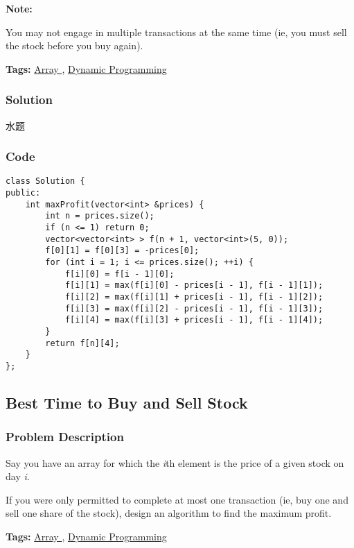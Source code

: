 \documentclass{article}
\begin{document}
\begin{CJK*}{UTF8}{gkai}
\textbf{Note:}


You may not engage in multiple transactions at the same time (ie, you must sell the stock before you buy again).


\textbf{Tags: }
\hyperref[ Array ]{ Array },  \hyperref[ Dynamic Programming ]{ Dynamic Programming }



\subsubsection*{Solution}
水题

\subsubsection*{Code}
\begin{lstlisting}
class Solution {
public:
    int maxProfit(vector<int> &prices) {
        int n = prices.size();
        if (n <= 1) return 0;
        vector<vector<int> > f(n + 1, vector<int>(5, 0));
        f[0][1] = f[0][3] = -prices[0];
        for (int i = 1; i <= prices.size(); ++i) {
            f[i][0] = f[i - 1][0];
            f[i][1] = max(f[i][0] - prices[i - 1], f[i - 1][1]);
            f[i][2] = max(f[i][1] + prices[i - 1], f[i - 1][2]);
            f[i][3] = max(f[i][2] - prices[i - 1], f[i - 1][3]);
            f[i][4] = max(f[i][3] + prices[i - 1], f[i - 1][4]);
        }
        return f[n][4];
    }
};

\end{lstlisting}


\subsection{ Best Time to Buy and Sell Stock }
\label{ Best Time to Buy and Sell Stock }

\subsubsection*{Problem Description}
Say you have an array for which the \emph{i}th element is the price of a given stock on day \emph{i}.

If you were only permitted to complete at most one transaction (ie, buy one and sell one share of the stock), design an algorithm to find the maximum profit.


\textbf{Tags: }
\hyperref[ Array ]{ Array },  \hyperref[ Dynamic Programming ]{ Dynamic Programming }



\end{CJK*}
\end{document}
